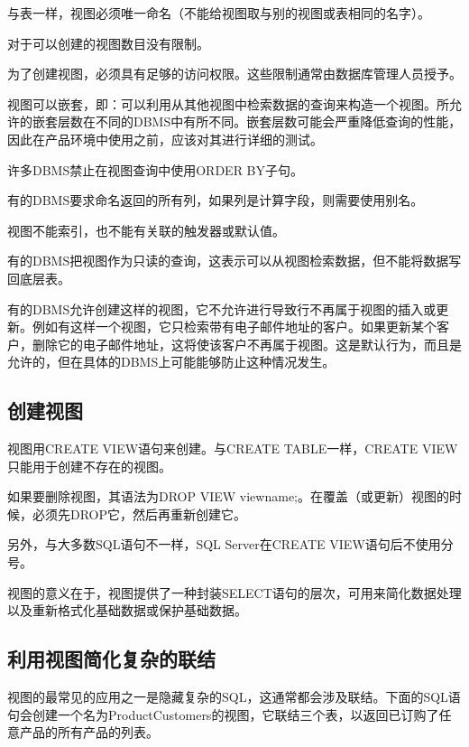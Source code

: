 \begin{compactitem}
\item 与表一样，视图必须唯一命名（不能给视图取与别的视图或表相同的名字）。
\item 对于可以创建的视图数目没有限制。
\item 为了创建视图，必须具有足够的访问权限。这些限制通常由数据库管理人员授予。
\item 视图可以嵌套，即：可以利用从其他视图中检索数据的查询来构造一个视图。所允许的嵌套层数在不同的DBMS中有所不同。嵌套层数可能会严重降低查询的性能，因此在产品环境中使用之前，应该对其进行详细的测试。
\item 许多DBMS禁止在视图查询中使用ORDER BY子句。
\item 有的DBMS要求命名返回的所有列，如果列是计算字段，则需要使用别名。
\item 视图不能索引，也不能有关联的触发器或默认值。
\item 有的DBMS把视图作为只读的查询，这表示可以从视图检索数据，但不能将数据写回底层表。
\item 有的DBMS允许创建这样的视图，它不允许进行导致行不再属于视图的插入或更新。例如有这样一个视图，它只检索带有电子邮件地址的客户。如果更新某个客户，删除它的电子邮件地址，这将使该客户不再属于视图。这是默认行为，而且是允许的，但在具体的DBMS上可能能够防止这种情况发生。
\end{compactitem}

\subsection{创建视图}



视图用CREATE VIEW语句来创建。与CREATE TABLE一样，CREATE VIEW只能用于创建不存在的视图。

如果要删除视图，其语法为DROP VIEW viewname;。在覆盖（或更新）视图的时候，必须先DROP它，然后再重新创建它。

另外，与大多数SQL语句不一样，SQL Server在CREATE VIEW语句后不使用分号。

视图的意义在于，视图提供了一种封装SELECT语句的层次，可用来简化数据处理以及重新格式化基础数据或保护基础数据。


\subsection{利用视图简化复杂的联结}

视图的最常见的应用之一是隐藏复杂的SQL，这通常都会涉及联结。下面的SQL语句会创建一个名为ProductCustomers的视图，它联结三个表，以返回已订购了任意产品的所有产品的列表。


